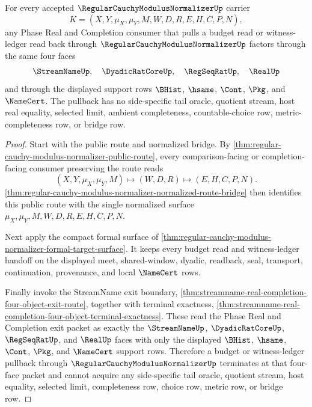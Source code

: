 \begin{theorem}
\label{thm:regular-cauchy-modulus-normalizer-budget-pullback-exhaustion}
For every accepted $\RegularCauchyModulusNormalizerUp$ carrier
$$
K=(X,Y,\mu_X,\mu_Y,M,W,D,R,E,H,C,P,N),
$$
any Phase Real and Completion consumer that pulls a budget read or
witness-ledger read back through $\RegularCauchyModulusNormalizerUp$ factors
through the same four faces
$$
\StreamNameUp,\quad \DyadicRatCoreUp,\quad \RegSeqRatUp,\quad \RealUp
$$
and through the displayed support rows $\BHist$, $\hsame$, $\Cont$, $\Pkg$,
and $\NameCert$. The pullback has no side-specific tail oracle, quotient
stream, host real equality, selected limit, ambient completeness,
countable-choice row, metric-completeness row, or bridge row.
\end{theorem}
\begin{proof}
Start with the public route and normalized bridge. By
\autoref{thm:regular-cauchy-modulus-normalizer-public-route}, every
comparison-facing or completion-facing consumer preserving the route reads
$$
(X,Y,\mu_X,\mu_Y,M)\longmapsto(W,D,R)\longmapsto(E,H,C,P,N).
$$
\autoref{thm:regular-cauchy-modulus-normalizer-normalized-route-bridge} then
identifies this public route with the single normalized surface
$\mu_X,\mu_Y,M,W,D,R,E,H,C,P,N$.

Next apply the compact formal surface of
\autoref{thm:regular-cauchy-modulus-normalizer-formal-target-surface}. It
keeps every budget read and witness-ledger handoff on the displayed meet,
shared-window, dyadic, readback, seal, transport, continuation, provenance, and
local $\NameCert$ rows.

Finally invoke the StreamName exit boundary,
\autoref{thm:streamname-real-completion-four-object-exit-route}, together with
terminal exactness,
\autoref{thm:streamname-real-completion-four-object-terminal-exactness}. These
read the Phase Real and Completion exit packet as exactly the
$\StreamNameUp$, $\DyadicRatCoreUp$, $\RegSeqRatUp$, and $\RealUp$ faces with
only the displayed $\BHist$, $\hsame$, $\Cont$, $\Pkg$, and $\NameCert$ support
rows. Therefore a budget or witness-ledger pullback through
$\RegularCauchyModulusNormalizerUp$ terminates at that four-face packet and
cannot acquire any side-specific tail oracle, quotient stream, host equality,
selected limit, completeness row, choice row, metric row, or bridge row.
\end{proof}

